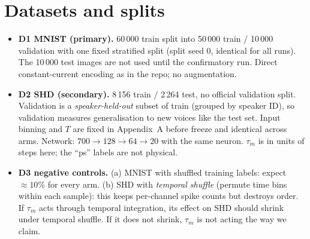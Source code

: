 \documentclass[10pt,a4paper]{article}
\newcommand{\taum}{\tau_m}
\begin{document}
\section{Datasets and splits}\label{sec:data}
\begin{itemize}
\item \textbf{D1 MNIST (primary).} 60\,000 train split into 50\,000 train / 10\,000 validation with one fixed stratified split (split seed 0, identical for all runs). The 10\,000 test images are not used until the confirmatory run. Direct constant-current encoding as in the repo; no augmentation.
\item \textbf{D2 SHD (secondary).} 8\,156 train / 2\,264 test, no official validation split. Validation is a \emph{speaker-held-out} subset of train (grouped by speaker ID), so validation measures generalisation to new voices like the test set. Input binning and $T$ are fixed in Appendix~A before freeze and identical across arms. Network: $700\to128\to64\to20$ with the same neuron. $\taum$ is in units of steps here; the ``ps'' labels are not physical.
\item \textbf{D3 negative controls.} (a) MNIST with shuffled training labels: expect $\approx10\%$ for every arm. (b) SHD with \emph{temporal shuffle} (permute time bins within each sample): this keeps per-channel spike counts but destroys order. If $\taum$ acts through temporal integration, its effect on SHD should shrink under temporal shuffle. If it does not shrink, $\taum$ is not acting the way we claim.
\end{itemize}
\end{document}
